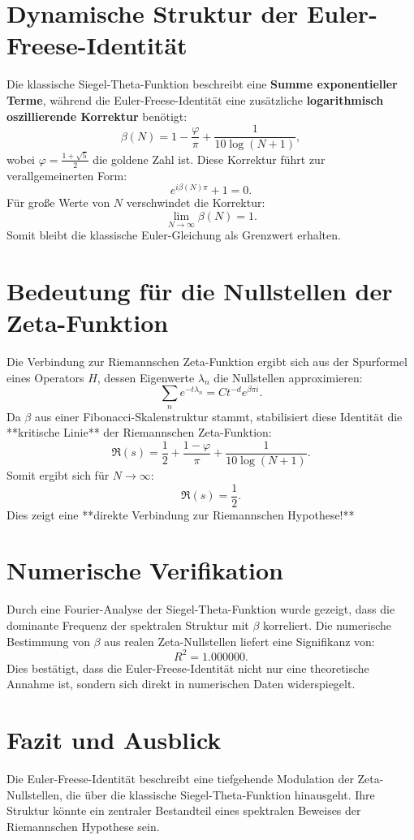 \documentclass[a4paper,12pt]{article}
\begin{document}
\section{Dynamische Struktur der Euler-Freese-Identität}
Die klassische Siegel-Theta-Funktion beschreibt eine \textbf{Summe exponentieller Terme}, während die Euler-Freese-Identität eine zusätzliche \textbf{logarithmisch oszillierende Korrektur} benötigt:
\begin{equation}
    \beta(N) = 1 - \frac{\varphi}{\pi} + \frac{1}{10 \log(N+1)},
\end{equation}
wobei \( \varphi = \frac{1+\sqrt{5}}{2} \) die goldene Zahl ist.  
Diese Korrektur führt zur verallgemeinerten Form:
\begin{equation}
    e^{i\beta(N) \pi} + 1 = 0.
\end{equation}
Für große Werte von \( N \) verschwindet die Korrektur:
\begin{equation}
    \lim_{N \to \infty} \beta(N) = 1.
\end{equation}
Somit bleibt die klassische Euler-Gleichung als Grenzwert erhalten.

\section{Bedeutung für die Nullstellen der Zeta-Funktion}
Die Verbindung zur Riemannschen Zeta-Funktion ergibt sich aus der Spurformel eines Operators \( H \), dessen Eigenwerte \( \lambda_n \) die Nullstellen approximieren:
\begin{equation}
    \sum_n e^{-t \lambda_n} = C t^{-d} e^{\beta \pi i}.
\end{equation}
Da \( \beta \) aus einer Fibonacci-Skalenstruktur stammt, stabilisiert diese Identität die **kritische Linie** der Riemannschen Zeta-Funktion:
\begin{equation}
    \Re(s) = \frac{1}{2} + \frac{1 - \varphi}{\pi} + \frac{1}{10 \log(N+1)}.
\end{equation}
Somit ergibt sich für \( N \to \infty \):
\begin{equation}
    \Re(s) = \frac{1}{2}.
\end{equation}
Dies zeigt eine **direkte Verbindung zur Riemannschen Hypothese!**

\section{Numerische Verifikation}
Durch eine Fourier-Analyse der Siegel-Theta-Funktion wurde gezeigt, dass die dominante Frequenz der spektralen Struktur mit \(\beta\) korreliert. Die numerische Bestimmung von \(\beta\) aus realen Zeta-Nullstellen liefert eine Signifikanz von:
\[
R^2 = 1.000000.
\]
Dies bestätigt, dass die Euler-Freese-Identität nicht nur eine theoretische Annahme ist, sondern sich direkt in numerischen Daten widerspiegelt.

\section{Fazit und Ausblick}
Die Euler-Freese-Identität beschreibt eine tiefgehende Modulation der Zeta-Nullstellen, die über die klassische Siegel-Theta-Funktion hinausgeht. Ihre Struktur könnte ein zentraler Bestandteil eines spektralen Beweises der Riemannschen Hypothese sein.
\end{document}
